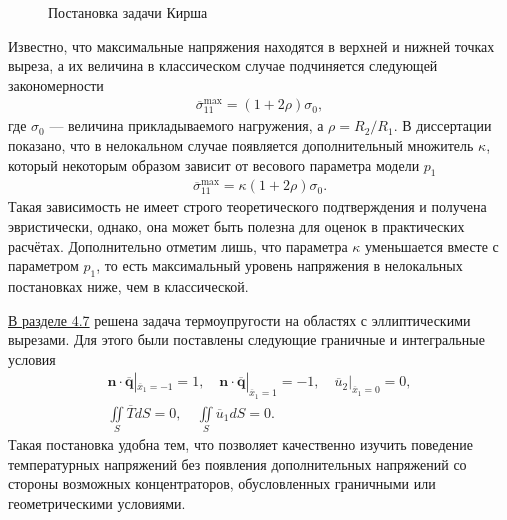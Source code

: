 \begin{figure}[ht]
    \caption{Постановка задачи Кирша}
    \label{fig:KirshProblem}
\end{figure}

Известно, что максимальные напряжения находятся в верхней и нижней точках выреза, а их величина в классическом случае подчиняется следующей закономерности
\begin{gather*}
	\overline{\sigma}_{11}^{\max} = \left( 1 + 2 \rho \right) \sigma_0,
\end{gather*}
где $\sigma_0$ --- величина прикладываемого нагружения, а $\rho = R_2 / R_1$. В диссертации показано, что в нелокальном случае появляется дополнительный множитель $\kappa$, который некоторым образом зависит от весового параметра модели $p_1$
 \begin{gather*}
	\overline{\sigma}_{11}^{\max} = \kappa \left( 1 + 2 \rho \right) \sigma_0.
\end{gather*}
Такая зависимость не имеет строго теоретического подтверждения и получена эвристически, однако, она может быть полезна для оценок в практических расчётах. Дополнительно отметим лишь, что параметра $\kappa$ уменьшается вместе с параметром $p_1$, то есть максимальный уровень напряжения в нелокальных постановках ниже, чем в классической.

\underline{В разделе 4.7} решена задача термоупругости на областях с эллиптическими вырезами. Для этого были поставлены следующие граничные и интегральные условия
\begin{gather*}
	\boldsymbol{n} \cdot \overline{\boldsymbol{q}}|_{\overline{x}_1 = -1} = 1,
	\quad
	\boldsymbol{n} \cdot \overline{\boldsymbol{q}}|_{\overline{x}_1 = 1} = -1,
	\quad
	\overline{u}_2 |_{\overline{x}_1 = 0} = 0,
	\\
	\iint\limits_S \overline{T} dS = 0,
	\quad
	\iint\limits_S \overline{u}_1 dS = 0.
\end{gather*}
Такая постановка удобна тем, что позволяет качественно изучить поведение температурных напряжений без появления дополнительных напряжений со стороны возможных концентраторов, обусловленных граничными или геометрическими условиями.

